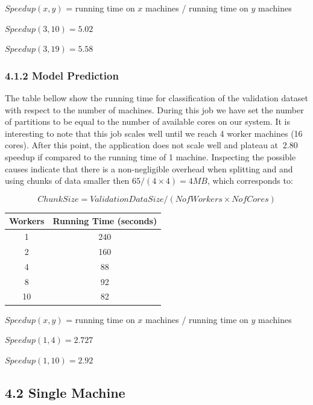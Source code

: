 \documentclass{neu_handout}
\begin{document}
\begin{center}
$Speed up(x,y)$ = running time on $x$ machines / running time on $y$ machines

$Speed up(3,10) = 5.02$

$Speed up(3,19) = 5.58$
\end{center}

\subsubsection*{4.1.2 Model Prediction}

The table bellow show the running time for classification of the validation dataset with respect to the number of machines. During this job we have set the number of partitions to be equal to the number of available cores on our system. It is interesting to note that this job scales well until we reach 4 worker machines (16 cores). After this point, the application does not scale well and plateau at $~2.80$ speedup if compared to the running time of 1 machine. Inspecting the possible causes indicate that there is a non-negligible overhead when splitting and and using chunks of data smaller then $65/(4\times 4)=4MB$, which corresponds to:

$$ChunkSize = ValidationDataSize/(NofWorkers \times NofCores)$$

\begin{center}
 \begin{tabular}{||c c ||} 
 \hline
Workers & Running Time (seconds) \\ [0.5ex] 
 \hline\hline
 1 & 240  \\ 
 \hline
 2 & 160  \\ 
 \hline
 4 & 88  \\ 
 \hline
 8 & 92  \\ 
 \hline
 10 & 82  \\  [1ex] 
 \hline
\end{tabular}
\end{center}

\begin{center}
$Speed up(x,y)$ = running time on $x$ machines / running time on $y$ machines

$Speed up(1,4) = 2.727$

$Speed up(1,10) = 2.92$
\end{center}


\subsection*{4.2 Single Machine}
\end{document}
